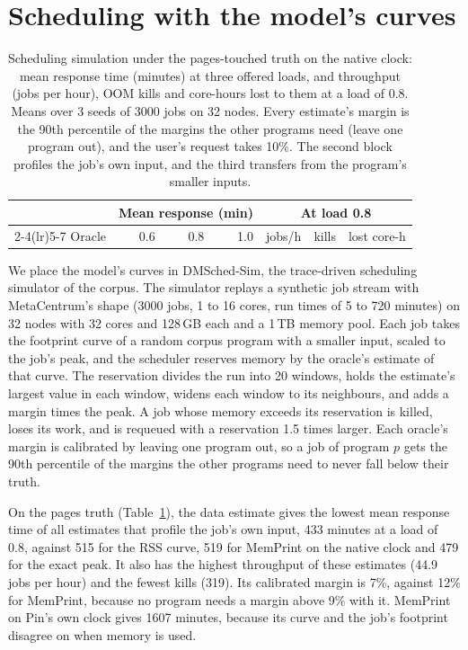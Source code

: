 \documentclass[11pt]{article}
\newcommand{\memprint}{MemPrint}
\newcommand{\tabref}[1]{Table~\ref{#1}}
\begin{document}
\section{Scheduling with the model's curves}
\label{sec:sched}

\begin{table}[t]
\centering
\small
\caption{Scheduling simulation under the pages-touched truth on the native clock: mean response time (minutes) at
three offered loads, and throughput (jobs per hour), OOM kills and core-hours lost to them at a load of 0.8. Means
over 3 seeds of 3000 jobs on 32 nodes. Every estimate's margin is the 90th percentile of the margins the other
programs need (leave one program out), and the user's request takes 10\%. The second block profiles the job's own
input, and the third transfers from the program's smaller inputs.}
\label{tab:sched}
\setlength{\tabcolsep}{5pt}
\begin{tabular}{lrrrrrr}
\toprule
 & \multicolumn{3}{c}{Mean response (min)} & \multicolumn{3}{c}{At load 0.8} \\
\cmidrule(lr){2-4}\cmidrule(lr){5-7}
Oracle & 0.6 & 0.8 & 1.0 & jobs/h & kills & lost core-h \\
\midrule

\bottomrule
\end{tabular}
\end{table}

We place the model's curves in DMSched-Sim, the trace-driven scheduling simulator of the corpus. The simulator replays
a synthetic job stream with MetaCentrum's shape (3000 jobs, 1 to 16 cores, run times of 5 to 720 minutes) on 32 nodes
with 32 cores and 128\,GB each and a 1\,TB memory pool. Each job takes the footprint curve of a random corpus program
with a smaller input, scaled to the job's peak, and the scheduler reserves memory by the oracle's estimate of that
curve. The reservation divides the run into 20 windows, holds the estimate's largest value in each window, widens each
window to its neighbours, and adds a margin times the peak. A job whose memory exceeds its reservation is killed, loses
its work, and is requeued with a reservation 1.5 times larger. Each oracle's margin is calibrated by leaving one
program out, so a job of program $p$ gets the 90th percentile of the margins the other programs need to never fall
below their truth.

On the pages truth (\tabref{tab:sched}), the data estimate gives the lowest mean response time of all estimates that
profile the job's own input, 433 minutes at a load of 0.8, against 515 for the RSS curve, 519 for \memprint{} on the
native clock and 479 for the exact peak. It also has the highest throughput of these estimates (44.9 jobs per hour)
and the fewest kills (319). Its calibrated margin is 7\%, against 12\% for \memprint{}, because no program needs a
margin above 9\% with it. \memprint{} on Pin's own clock gives 1607 minutes, because its curve and the job's footprint
disagree on when memory is used.
\end{document}
